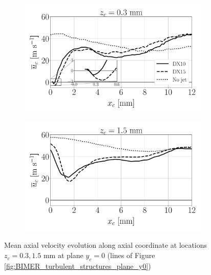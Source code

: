 


\begin{figure}[ht]
\flushleft
\begin{subfigure}[b]{0.45\textwidth}
	\flushleft
   \includegraphics[scale=0.25]{./part3_applications/figures_ch8_resolved/turbulent_structures/line_y0_along_x_zlow}
\end{subfigure}
\hspace{0.4in}
\begin{subfigure}[b]{0.45\textwidth}
	\flushleft
   \includegraphics[scale=0.25]{./part3_applications/figures_ch8_resolved/turbulent_structures/line_y0_along_x_zhigh}
\end{subfigure}
\vspace{-0.15in}
\caption{Mean axial velocity evolution along axial coordinate at locations $z_c = 0.3, 1.5$ mm at plane $y_c = 0$ (lines of Figure \ref{fig:BIMER_turbulent_structures_plane_y0})}
\label{fig:BIMER_sps_lines_y0_along_x_ux_mean}
\end{figure}


